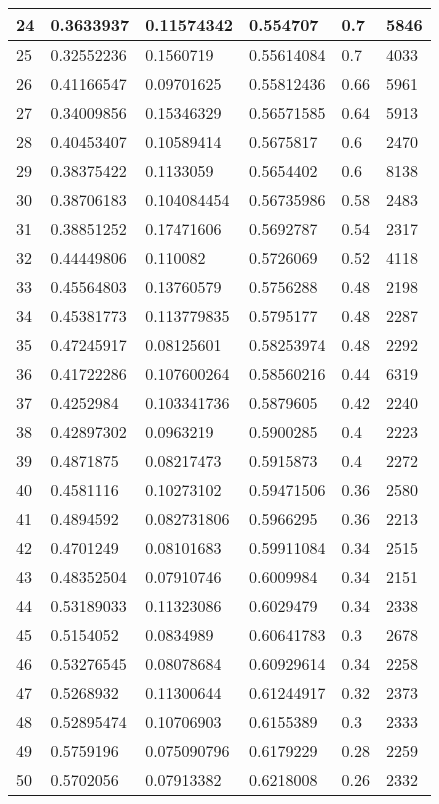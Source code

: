 \begin{longtable}{|l|l|l|l|l|l|}
24 & 0.3633937 & 0.11574342 & 0.554707 & 0.7 & 5846 \\ \hline 
25 & 0.32552236 & 0.1560719 & 0.55614084 & 0.7 & 4033 \\ \hline 
26 & 0.41166547 & 0.09701625 & 0.55812436 & 0.66 & 5961 \\ \hline 
27 & 0.34009856 & 0.15346329 & 0.56571585 & 0.64 & 5913 \\ \hline 
28 & 0.40453407 & 0.10589414 & 0.5675817 & 0.6 & 2470 \\ \hline 
29 & 0.38375422 & 0.1133059 & 0.5654402 & 0.6 & 8138 \\ \hline 
30 & 0.38706183 & 0.104084454 & 0.56735986 & 0.58 & 2483 \\ \hline 
31 & 0.38851252 & 0.17471606 & 0.5692787 & 0.54 & 2317 \\ \hline 
32 & 0.44449806 & 0.110082 & 0.5726069 & 0.52 & 4118 \\ \hline 
33 & 0.45564803 & 0.13760579 & 0.5756288 & 0.48 & 2198 \\ \hline 
34 & 0.45381773 & 0.113779835 & 0.5795177 & 0.48 & 2287 \\ \hline 
35 & 0.47245917 & 0.08125601 & 0.58253974 & 0.48 & 2292 \\ \hline 
36 & 0.41722286 & 0.107600264 & 0.58560216 & 0.44 & 6319 \\ \hline 
37 & 0.4252984 & 0.103341736 & 0.5879605 & 0.42 & 2240 \\ \hline 
38 & 0.42897302 & 0.0963219 & 0.5900285 & 0.4 & 2223 \\ \hline 
39 & 0.4871875 & 0.08217473 & 0.5915873 & 0.4 & 2272 \\ \hline 
40 & 0.4581116 & 0.10273102 & 0.59471506 & 0.36 & 2580 \\ \hline 
41 & 0.4894592 & 0.082731806 & 0.5966295 & 0.36 & 2213 \\ \hline 
42 & 0.4701249 & 0.08101683 & 0.59911084 & 0.34 & 2515 \\ \hline 
43 & 0.48352504 & 0.07910746 & 0.6009984 & 0.34 & 2151 \\ \hline 
44 & 0.53189033 & 0.11323086 & 0.6029479 & 0.34 & 2338 \\ \hline 
45 & 0.5154052 & 0.0834989 & 0.60641783 & 0.3 & 2678 \\ \hline 
46 & 0.53276545 & 0.08078684 & 0.60929614 & 0.34 & 2258 \\ \hline 
47 & 0.5268932 & 0.11300644 & 0.61244917 & 0.32 & 2373 \\ \hline 
48 & 0.52895474 & 0.10706903 & 0.6155389 & 0.3 & 2333 \\ \hline 
49 & 0.5759196 & 0.075090796 & 0.6179229 & 0.28 & 2259 \\ \hline 
50 & 0.5702056 & 0.07913382 & 0.6218008 & 0.26 & 2332 \\ \hline 
\end{longtable}